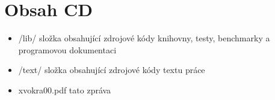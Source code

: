 \chapter{Obsah CD}
\begin{itemize}
	\item{/lib/ složka obsahující zdrojové kódy knihovny, testy, benchmarky a programovou dokumentaci}
	\item{/text/ složka obsahující zdrojové kódy textu práce}
	\item{xvokra00.pdf tato zpráva}
\end{itemize}


